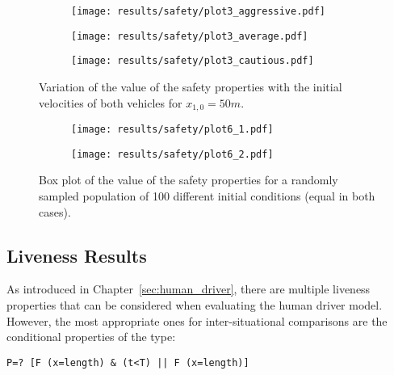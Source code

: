 \begin{figure}[H]
\centering
\begin{subfigure}{0.55\textwidth}
  \centering
  \texttt{[image: results/safety/plot3\_aggressive.pdf]}
\end{subfigure}
\begin{subfigure}{0.55\textwidth}
  \centering
  \texttt{[image: results/safety/plot3\_average.pdf]}
\end{subfigure} 
\begin{subfigure}{0.55\textwidth}
  \centering
  \texttt{[image: results/safety/plot3\_cautious.pdf]}
\end{subfigure} 
\caption{Variation of the value of the safety properties with the initial velocities of both vehicles for $x_{1,0} = 50m$.}
\label{fig:plot3}
\end{figure}

\begin{figure}[H]
\centering
\begin{subfigure}{0.49\textwidth}
  \centering
  \texttt{[image: results/safety/plot6\_1.pdf]}
\end{subfigure}
\begin{subfigure}{0.49\textwidth}
  \centering
  \texttt{[image: results/safety/plot6\_2.pdf]}
\end{subfigure} 
\caption{Box plot of the value of the safety properties for a randomly sampled population of 100 different initial conditions (equal in both cases).}
\label{fig:plot6}
\end{figure}

\subsection{Liveness Results}
\label{sec:res_liveness}

As introduced in Chapter~\ref{sec:human_driver}, there are multiple liveness properties that can be considered when evaluating the human driver model. However, the most appropriate ones for inter-situational comparisons are the conditional properties of the type:

\begin{minipage}{\linewidth}
{\vspace{1em}
\begin{lstlisting}
P=? [F (x=length) & (t<T) || F (x=length)]
\end{lstlisting}
}
\end{minipage}

